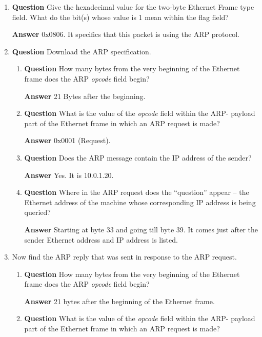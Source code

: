 \documentclass[12pt,letterpaper]{article}
\newcommand{\q}{\textbf{Question} }
\newcommand{\ans}{\textbf{Answer} }
\begin{document}
\begin{enumerate}
\ans Source: 00:22:75:af:71:6b. Destination: ff:ff:ff:ff:ff:ff.

\item \q Give the hexadecimal value for the two-byte Ethernet Frame type
    field. What do the bit(s) whose value is 1 mean within the flag field?

\ans 0x0806. It specifics that this packet is using the ARP protocol.

\item \q Download the ARP specification.
    \begin{enumerate}
        \item \q How many bytes from the very beginning of the Ethernet frame
            does the ARP \emph{opcode} field begin?

        \ans 21 Bytes after the beginning.

        \item \q What is the value of the \emph{opcode} field within the ARP-
            payload part of the Ethernet frame in which an ARP request is
            made?

        \ans 0x0001 (Request).

        \item \q Does the ARP message contain the IP address of the sender?

        \ans Yes. It is 10.0.1.20.

        \item \q Where in the ARP request does the ``question'' appear -- the
            Ethernet address of the machine whose corresponding IP address
            is being queried?

        \ans Starting at byte 33 and going till byte 39. It comes just after
            the sender Ethernet address and IP address is listed.
    \end{enumerate}

\pagebreak

\pagebreak

\item Now find the ARP reply that was sent in response to the ARP request.
    \begin{enumerate}
        \item \q How many bytes from the very beginning of the Ethernet frame
            does the ARP \emph{opcode} field begin?

        \ans 21 bytes after the beginning of the Ethernet frame.

        \item \q What is the value of the \emph{opcode} field within the ARP-
            payload part of the Ethernet frame in which an ARP request is
            made?


\end{enumerate}
\end{enumerate}
\end{document}
